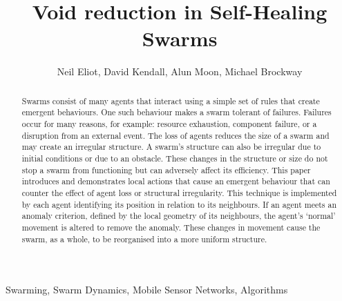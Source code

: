 \documentclass[preprint,12pt]{elsarticle}
\begin{document}
\begin{frontmatter}



\title{Void reduction in Self-Healing Swarms}


\author{Neil Eliot, David Kendall, Alun Moon, Michael Brockway}

\address{Northumbria University, Department of Computing and Information Sciences, Newcastle upon Tyne, NE1 8ST}

\begin{abstract}
Swarms consist of many agents that interact using a simple set of rules that create emergent behaviours. One such behaviour makes a swarm tolerant of failures. Failures occur for many reasons, for example: resource exhaustion, component failure, or a disruption from an external event. The loss of agents reduces the size of a swarm and may create an irregular structure. A swarm's structure can also be irregular due to initial conditions or due to an obstacle. These changes in the structure or size do not stop a swarm from functioning but can adversely affect its efficiency. This paper introduces and demonstrates local actions that cause an emergent behaviour that can counter the effect of agent loss or structural irregularity. This technique is implemented by each agent identifying its position in relation to its neighbours. If an agent meets an anomaly criterion, defined by the local geometry of its neighbours, the agent's `normal' movement is altered to remove the anomaly. These changes in movement cause the swarm, as a whole, to be reorganised into a more uniform structure.
\end{abstract}

\begin{keyword}
Swarming, Swarm Dynamics, Mobile Sensor Networks, Algorithms



\end{keyword}

\end{frontmatter}
\end{document}

